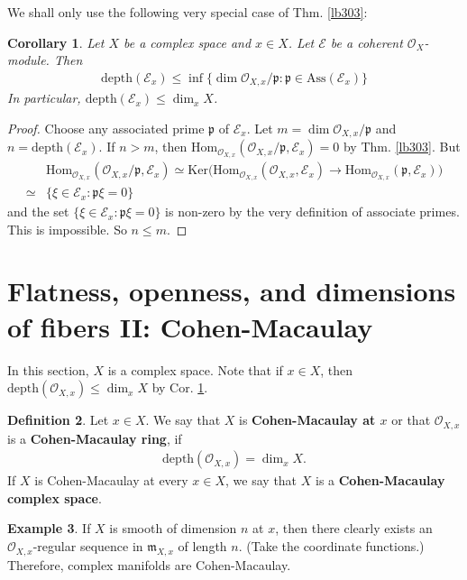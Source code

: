 \documentclass[12pt,b5paper,notitlepage]{report}
\theoremstyle{definition}
\newtheorem{df}{Definition}[section]
\newtheorem{eg}[df]{Example}
\theoremstyle{plain}
\newtheorem{co}[df]{Corollary}
\newcommand{\Hom}{\mathrm{Hom}}
\newcommand{\scr}{\mathscr}
\newcommand{\pk}{\mathfrak p}
\newcommand{\Ker}{\mathrm{Ker}}
\newcommand{\mk}{\mathfrak m}
\newcommand{\Ass}{\mathrm{Ass}}
\newcommand{\depth}{\mathrm{depth}}
\numberwithin{equation}{section}
\begin{document}
We shall only use the following very special case of Thm. \ref{lb303}:

\begin{co}\label{lb304}
Let $X$ be a complex space and $x\in X$. Let $\scr E$ be a coherent $\scr O_X$-module. Then
\begin{align*}
\depth(\scr E_x)\leq \inf\big\{\dim \scr O_{X,x}/\pk:\pk\in\Ass(\scr E_x) \big\}
\end{align*}
In particular, $\depth(\scr E_x)\leq\dim_x X$.
\end{co}



\begin{proof}
Choose any associated prime $\pk$ of $\scr E_x$. Let $m=\dim\scr O_{X,x}/\pk$ and $n=\depth(\scr E_x)$. If $n>m$, then $\Hom_{\scr O_{X,x}}(\scr O_{X,x}/\pk,\scr E_x)=0$ by Thm. \ref{lb303}. But 
\begin{align*}
&\Hom_{\scr O_{X,x}}(\scr O_{X,x}/\pk,\scr E_x)\simeq\Ker\big(\Hom_{\scr O_{X,x}}(\scr O_{X,x},\scr E_x)\rightarrow \Hom_{\scr O_{X,x}}(\pk,\scr E_x)\big)\\
\simeq&\{\xi\in\scr E_x:\pk\xi=0\}
\end{align*}
and the set $\{\xi\in\scr E_x:\pk\xi=0\}$ is non-zero by the very definition of associate primes. This is impossible. So $n\leq m$.
\end{proof}


\section{Flatness, openness, and dimensions of fibers II: Cohen-Macaulay}

In this section, $X$ is a complex space. Note that if $x\in X$, then $\depth(\scr O_{X,x})\leq\dim_xX$ by Cor. \ref{lb304}.

\begin{df}
Let $x\in X$. We say that $X$ is \textbf{Cohen-Macaulay at $x$} or that $\scr O_{X,x}$ is a \textbf{Cohen-Macaulay ring}, if
\begin{align*}
\depth(\scr O_{X,x})=\dim_xX.
\end{align*}
If $X$ is Cohen-Macaulay at every $x\in X$, we say that $X$ is a \textbf{Cohen-Macaulay complex space}.
\end{df}




\begin{eg}
If $X$ is smooth of dimension $n$ at $x$, then there clearly exists an $\scr O_{X,x}$-regular sequence in $\mk_{X,x}$ of length $n$. (Take the coordinate functions.) Therefore, complex manifolds are Cohen-Macaulay.
\end{eg}
\end{document}
